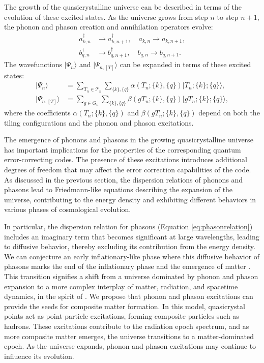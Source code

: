 \documentclass{article}
\begin{document}
The growth of the quasicrystalline universe can be described in terms of the evolution of these excited states. As the universe grows from step $n$ to step $n+1$, the phonon and phason creation and annihilation operators evolve:
\begin{align}
a^{\dagger}_{k,n} &\rightarrow a^{\dagger}_{k,n+1}, \quad a_{k,n} \rightarrow a_{k,n+1}, \\
b^{\dagger}_{q,n} &\rightarrow b^{\dagger}_{q,n+1}, \quad b_{q,n} \rightarrow b_{q,n+1}.
\end{align}
The wavefunctions $|\Psi_n\rangle$ and $|\Psi_{n,[T]}\rangle$ can be expanded in terms of these excited states:
\begin{align}
|\Psi_n\rangle &= \sum_{T_n \in \mathcal{T}_n} \sum_{\{k\}, \{q\}} \alpha(T_n; \{k\}, \{q\}) |T_n; \{k\}; \{q\}\rangle, \\
|\Psi_{n,[T]}\rangle &= \sum_{g \in G_n} \sum_{\{k\}, \{q\}} \beta(g T_n; \{k\}, \{q\}) |g T_n; \{k\}; \{q\}\rangle,
\end{align}
where the coefficients $\alpha(T_n; \{k\}, \{q\})$ and $\beta(g T_n; \{k\}, \{q\})$ depend on both the tiling configurations and the phonon and phason excitations.


The emergence of phonons and phasons in the growing quasicrystalline universe has important implications for the properties of the corresponding quantum error-correcting codes. The presence of these excitations introduces additional degrees of freedom that may affect the error correction capabilities of the code. As discussed in the previous section, the dispersion relations of phonons and phasons lead to Friedmann-like equations describing the expansion of the universe, contributing to the energy density and exhibiting different behaviors in various phases of cosmological evolution.

In particular, the dispersion relation for phasons (Equation \ref{eq:phasonrelation}) includes an imaginary term that becomes significant at large wavelengths, leading to diffusive behavior, thereby excluding its contribution from the energy density. We can conjecture an early inflationary-like phase where this diffusive behavior of phasons marks the end of the inflationary phase and the emergence of matter \cite{modelsetemergence}. This transition signifies a shift from a universe dominated by phonon and phason expansion to a more complex interplay of matter, radiation, and spacetime dynamics, in the spirit of \cite{Barbour2003}. We propose that phonon and phason excitations can provide the seeds for composite matter formation.  
In this model, quasicrystal points act as point-particle excitations, forming composite particles such as hadrons. These excitations contribute to the radiation epoch spectrum, and as more composite matter emerges, the universe transitions to a matter-dominated epoch. As the universe expands, phonon and phason excitations may continue to influence its evolution.
\end{document}
